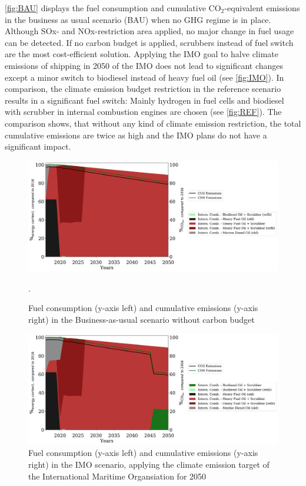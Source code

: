 \documentclass[article]{elsarticle}
\begin{document}
\autoref{fig:BAU} displays the fuel consumption and cumulative CO$_2$-equivalent emissions in the business as usual scenario (BAU) when no GHG regime is in place. Although SOx- and NOx-restriction area applied, no major change in fuel usage can be detected. If no carbon budget is applied, scrubbers instead of fuel switch are the most cost-efficient solution. Applying the IMO goal to halve climate emissions of shipping in 2050 of the IMO does not lead to significant changes except a minor switch to biodiesel instead of heavy fuel oil (see \autoref{fig:IMO}). In comparison, the climate emission budget restriction in the reference scenario  results in a significant fuel switch: Mainly hydrogen in fuel cells and biodiesel with scrubber in internal combustion engines are chosen (see \autoref{fig:REF}). The comparison shows, that without any kind of climate emission restriction, the total cumulative emissions are twice as high and the IMO plans do not have a significant impact. 

\begin{figure}
    \centering
    \includegraphics[width=\textwidth]{figures/BAU_fuels_emissions.pdf}
    \caption{Fuel consumption (y-axis left) and cumulative emissions (y-axis right) in the Business-as-usual scenario without carbon budget}
    \label{fig:BAU}.
\end{figure}

\begin{figure}
    \centering
    \includegraphics[width=\textwidth]{figures/IMO_fuels_emissions.pdf}
    \caption{Fuel consumption (y-axis left) and cumulative emissions (y-axis right) in the IMO scenario, applying the climate emission target of the International Maritime Organsiation for 2050}
    \label{fig:IMO}
\end{figure}
\end{document}

